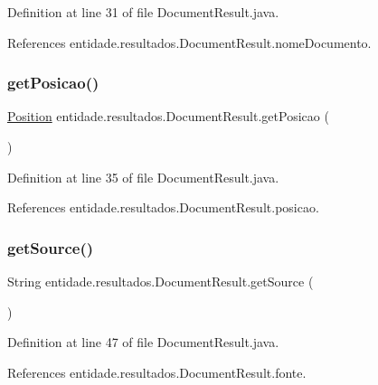 Definition at line 31 of file Document\+Result.\+java.



References entidade.\+resultados.\+Document\+Result.\+nome\+Documento.

\hypertarget{classentidade_1_1resultados_1_1DocumentResult_a0ed7bb9d4c27fad1bc0f9c1858f90699}{}\label{classentidade_1_1resultados_1_1DocumentResult_a0ed7bb9d4c27fad1bc0f9c1858f90699} 
\subsubsection{\texorpdfstring{get\+Posicao()}{getPosicao()}}
{\footnotesize\ttfamily \hyperlink{classentidade_1_1Position}{Position} entidade.\+resultados.\+Document\+Result.\+get\+Posicao (\begin{DoxyParamCaption}{ }\end{DoxyParamCaption})}



Definition at line 35 of file Document\+Result.\+java.



References entidade.\+resultados.\+Document\+Result.\+posicao.

\hypertarget{classentidade_1_1resultados_1_1DocumentResult_a61e790adc2fe5d757ceae4ef067aedc4}{}\label{classentidade_1_1resultados_1_1DocumentResult_a61e790adc2fe5d757ceae4ef067aedc4} 
\subsubsection{\texorpdfstring{get\+Source()}{getSource()}}
{\footnotesize\ttfamily String entidade.\+resultados.\+Document\+Result.\+get\+Source (\begin{DoxyParamCaption}{ }\end{DoxyParamCaption})}



Definition at line 47 of file Document\+Result.\+java.



References entidade.\+resultados.\+Document\+Result.\+fonte.




